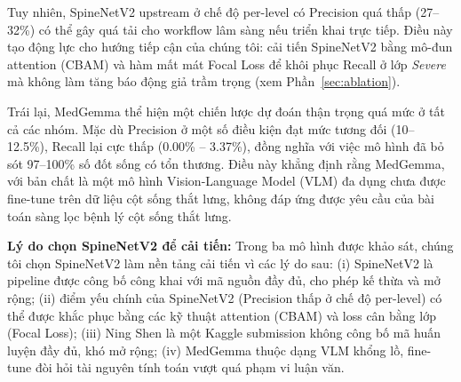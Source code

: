 Tuy nhiên, SpineNetV2 upstream ở chế độ per-level có Precision quá thấp (27--32\%) có thể gây quá tải cho workflow lâm sàng nếu triển khai trực tiếp. Điều này tạo động lực cho hướng tiếp cận của chúng tôi: cải tiến SpineNetV2 bằng mô-đun attention (CBAM) và hàm mất mát Focal Loss để khôi phục Recall ở lớp \textit{Severe} mà không làm tăng báo động giả trầm trọng (xem Phần~\ref{sec:ablation}).

Trái lại, MedGemma thể hiện một chiến lược dự đoán thận trọng quá mức ở tất cả các nhóm. Mặc dù Precision ở một số điều kiện đạt mức tương đối (10--12.5\%), Recall lại cực thấp (0.00\% -- 3.37\%), đồng nghĩa với việc mô hình đã bỏ sót 97--100\% số đốt sống có tổn thương. Điều này khẳng định rằng MedGemma, với bản chất là một mô hình Vision-Language Model (VLM) đa dụng chưa được fine-tune trên dữ liệu cột sống thắt lưng, không đáp ứng được yêu cầu của bài toán sàng lọc bệnh lý cột sống thắt lưng.

\textbf{Lý do chọn SpineNetV2 để cải tiến:} Trong ba mô hình được khảo sát, chúng tôi chọn SpineNetV2 làm nền tảng cải tiến vì các lý do sau: (i) SpineNetV2 là pipeline được công bố công khai với mã nguồn đầy đủ, cho phép kế thừa và mở rộng; (ii) điểm yếu chính của SpineNetV2 (Precision thấp ở chế độ per-level) có thể được khắc phục bằng các kỹ thuật attention (CBAM) và loss cân bằng lớp (Focal Loss); (iii) Ning Shen là một Kaggle submission không công bố mã huấn luyện đầy đủ, khó mở rộng; (iv) MedGemma thuộc dạng VLM khổng lồ, fine-tune đòi hỏi tài nguyên tính toán vượt quá phạm vi luận văn.
